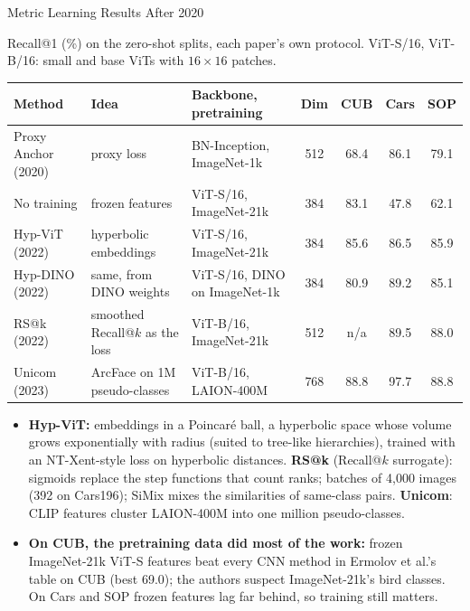 \begin{frame}{Metric Learning Results After 2020}

  {\centering\scriptsize Recall@1 (\%) on the zero-shot splits, each paper's own protocol. ViT-S/16, ViT-B/16: small and base ViTs with $16\times16$ patches.\par}
  \vspace{0.2em}
  {\centering\scriptsize\setlength{\tabcolsep}{3.5pt}
  \begin{tabular}{@{}>{\raggedright\arraybackslash}p{2.4cm} >{\raggedright\arraybackslash}p{3.9cm} >{\raggedright\arraybackslash}p{3.3cm} c c c c@{}}
    \toprule
    \textbf{Method} & \textbf{Idea} & \textbf{Backbone, pretraining} & \textbf{Dim} & \textbf{CUB} & \textbf{Cars} & \textbf{SOP} \\
    \midrule
    Proxy Anchor (2020) & proxy loss & BN-Inception, ImageNet-1k & 512 & 68.4 & 86.1 & 79.1 \\
    No training & frozen features & ViT-S/16, ImageNet-21k & 384 & 83.1 & 47.8 & 62.1 \\
    Hyp-ViT (2022) & hyperbolic embeddings & ViT-S/16, ImageNet-21k & 384 & 85.6 & 86.5 & 85.9 \\
    Hyp-DINO (2022) & same, from DINO weights & ViT-S/16, DINO on ImageNet-1k & 384 & 80.9 & 89.2 & 85.1 \\
    RS@k (2022) & smoothed Recall@$k$ as the loss & ViT-B/16, ImageNet-21k & 512 & n/a & 89.5 & 88.0 \\
    Unicom (2023) & ArcFace on 1M pseudo-classes & ViT-B/16, LAION-400M & 768 & 88.8 & 97.7 & 88.8 \\
    \bottomrule
  \end{tabular}\par}
  \vspace{0.3em}
  \begin{itemize}\scriptsize\itemsep0.15em
    \item \textbf{Hyp-ViT:} embeddings in a Poincar\'e ball, a hyperbolic space whose volume grows exponentially with radius (suited to tree-like hierarchies), trained with an NT-Xent-style loss on hyperbolic distances. \textbf{RS@k} (Recall@$k$ surrogate): sigmoids replace the step functions that count ranks; batches of 4{,}000 images (392 on Cars196); SiMix mixes the similarities of same-class pairs. \textbf{Unicom}: CLIP features cluster LAION-400M into one million pseudo-classes.
    \item \textbf{On CUB, the pretraining data did most of the work:} frozen ImageNet-21k ViT-S features beat every CNN method in Ermolov et al.'s table on CUB (best 69.0); the authors suspect ImageNet-21k's bird classes. On Cars and SOP frozen features lag far behind, so training still matters.

\end{itemize}
\end{frame}
